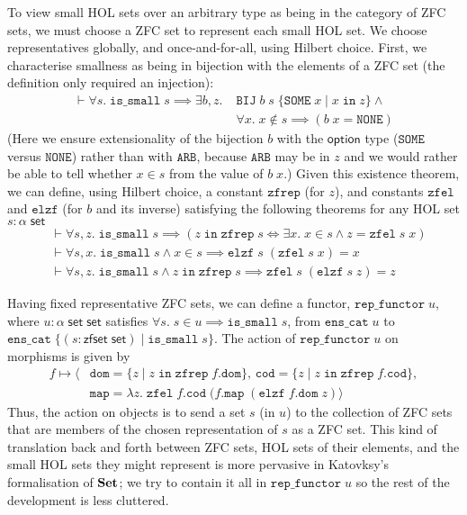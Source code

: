 \documentclass[twoside,titlepage,11pt]{article}
\begin{document}
To view small HOL sets over an arbitrary type as being in the category of ZFC sets, we must choose a ZFC set to represent each small HOL set.
We choose representatives globally, and once-and-for-all, using Hilbert choice.
First, we characterise smallness as being in bijection with the elements of a ZFC set (the definition only required an injection):
\begin{align*}
\vdash\forall{s}.\;\mathtt{is\_small}\;s\implies\exists{b,z}.\;&\mathtt{BIJ}\;b\;s\;\{\mathtt{SOME}\;x\mid x\operatorname{\mathtt{in}}z\}\land{}\\
&\forall{x}.\;x\notin s\implies(b\;x=\mathtt{NONE})
\end{align*}
(Here we ensure extensionality of the bijection $b$ with the $\mathsf{option}$ type ($\mathtt{SOME}$ versus $\mathtt{NONE}$) rather than with $\mathtt{ARB}$, because $\mathtt{ARB}$ may be in $z$ and we would rather be able to tell whether $x\in s$ from the value of $b\;x$.)
Given this existence theorem, we can define, using Hilbert choice, a constant
$\mathtt{zfrep}$ (for $z$), and constants $\mathtt{zfel}$ and $\mathtt{elzf}$ (for $b$ and its inverse) satisfying the following theorems for any HOL set $s:\alpha\;\mathsf{set}$
\begin{align*}
&\vdash\forall{s,z}.\;\mathtt{is\_small}\;s\implies(z\operatorname{\mathtt{in}}\mathtt{zfrep}\;s\iff\exists{x}.\; x \in s \land z = \mathtt{zfel}\;s\;x)\\
&\vdash\forall{s,x}.\;\mathtt{is\_small}\;s\land x \in s\implies\mathtt{elzf}\;s\;(\mathtt{zfel}\;s\;x) = x\\
&\vdash\forall{s,z}.\;\mathtt{is\_small}\;s\land z \operatorname{\mathtt{in}} \mathtt{zfrep}\;s\implies\mathtt{zfel}\;s\;(\mathtt{elzf}\;s\;z) = z
\end{align*}

Having fixed representative ZFC sets, we can define a functor, $\mathtt{rep\_functor}\;u$, where $u:\alpha\;\mathsf{set}\;\mathsf{set}$ satisfies $\forall{s}.\;s\in u\implies\mathtt{is\_small}\;s$, from $\mathtt{ens\_cat}\;u$ to $\mathtt{ens\_cat}\;\{(s:\mathsf{zfset}\;\mathsf{set})\mid\mathtt{is\_small}\;s\}$.
The action of $\mathtt{rep\_functor}\;u$ on morphisms is given by
\begin{align*}
f\mapsto\langle&\mathtt{dom}=\{z\mid z\operatorname{\mathtt{in}}\mathtt{zfrep}\;f.\mathtt{dom}\},\,\mathtt{cod}=\{z\mid z\operatorname{\mathtt{in}}\mathtt{zfrep}\;f.\mathtt{cod}\},\\
&\mathtt{map}=\lambda{z}.\;\mathtt{zfel}\;f.\mathtt{cod}\;(f.\mathtt{map}\;(\mathtt{elzf}\;f.\mathtt{dom}\;z)\rangle
\end{align*}
Thus, the action on objects is to send a set $s$ (in $u$) to the collection of ZFC sets that are members of the chosen representation of $s$ as a ZFC set.
This kind of translation back and forth between ZFC sets, HOL sets of their elements, and the small HOL sets they might represent is more pervasive in Katovksy's formalisation of $\mathbf{Set}$; we try to contain it all in $\mathtt{rep\_functor}\;u$ so the rest of the development is less cluttered.
\end{document}
